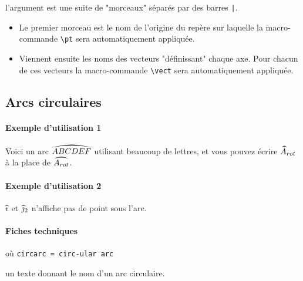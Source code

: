 \documentclass[12pt,a4paper]{article}
\theoremstyle{definition}
\begin{document}
\IDarg{} l'argument est une suite de "morceaux" séparés par des barres \verb+|+.

\begin{itemize}[topsep=0pt]
	\item Le premier morceau est le nom de l'origine du repère sur laquelle la macro-commande \verb+\pt+ sera automatiquement appliquée.

	\item Viennent ensuite les noms des vecteurs "définissant" chaque axe. Pour chacun de ces vecteurs la macro-commande \verb+\vect+ sera automatiquement appliquée.
\end{itemize}





\subsection{Arcs circulaires}

\paragraph{Exemple d'utilisation 1}

\begin{tcblisting}{}
Voici un arc $\circarc{ABCDEF}$ utilisant beaucoup de lettres, et vous pouvez écrire
$\circarc*{A}{rot}$ à la place de $\circarc{A_{rot}}$.
\end{tcblisting}


\paragraph{Exemple d'utilisation 2}

\begin{tcblisting}{}
$\circarc{i}$ et $\circarc*{j}{2}$ n'affiche pas de point sous l'arc.
\end{tcblisting}



\paragraph{Fiches techniques}

 où \quad \verb+circarc = circ-ular arc+

\IDarg{} un texte donnant le nom d'un arc circulaire.
\end{document}
